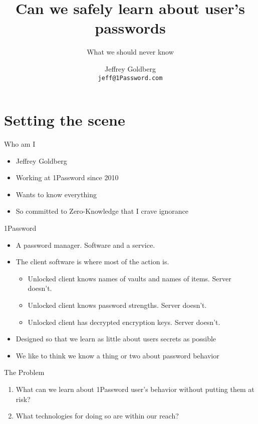 \documentclass[xcolor={dvipsnames,table,hyperref}]{beamer}
\author[J.~Goldberg]
{Jeffrey Goldberg\texorpdfstring{\\ \texttt{jeff@1Password.com}}{}}
\institute[1Password]{1Password}
\title{Can we safely learn about user's passwords}
\subtitle{What we should never know}
\begin{document}
\maketitle

\section{Setting the scene}

\begin{frame}{Who am I}
  \begin{itemize}
    \item Jeffrey Goldberg
    \item Working at 1Password since 2010
    \item Wants to know everything
    \item So committed to Zero-Knowledge that I crave ignorance
  \end{itemize}

\end{frame}

\begin{frame}{1Password}
  \begin{itemize}
    \item A password manager. Software and a service.
    \item The client software is where most of the action is.
          \begin{itemize}
            \item Unlocked client knows names of vaults and names of items. Server doesn't.
            \item Unlocked client knows password strengths. Server doesn't.
            \item Unlocked client has decrypted encryption keys. Server doesn't.
          \end{itemize}
    \item Designed so that we learn as little about users secrets as possible
    \item We like to think we know a thing or two about password behavior
  \end{itemize}
\end{frame}

\begin{frame}{The Problem}
  \begin{enumerate}
    \item What can we learn about 1Password user's behavior without putting them at risk?
    \item What technologies for doing so are within our reach?
  \end{enumerate}
\end{frame}
\end{document}

